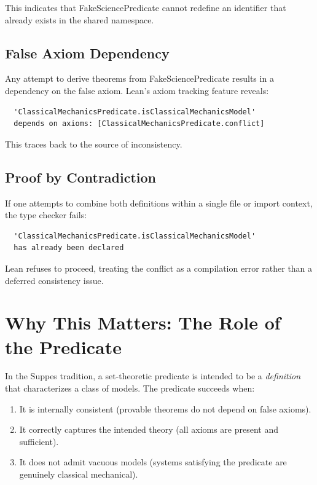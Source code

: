\documentclass[11pt]{article}
\begin{document}
This indicates that FakeSciencePredicate cannot redefine an identifier that
already exists in the shared namespace.

\subsection{False Axiom Dependency}

Any attempt to derive theorems from FakeSciencePredicate results in a
dependency on the false axiom. Lean's axiom tracking feature reveals:
\begin{verbatim}
  'ClassicalMechanicsPredicate.isClassicalMechanicsModel'
  depends on axioms: [ClassicalMechanicsPredicate.conflict]
\end{verbatim}

This traces back to the source of inconsistency.

\subsection{Proof by Contradiction}

If one attempts to combine both definitions within a single file or import
context, the type checker fails:
\begin{verbatim}
  'ClassicalMechanicsPredicate.isClassicalMechanicsModel'
  has already been declared
\end{verbatim}

Lean refuses to proceed, treating the conflict as a compilation error rather
than a deferred consistency issue.

\section{Why This Matters: The Role of the Predicate}

In the Suppes tradition, a set-theoretic predicate is intended to be a
\textit{definition} that characterizes a class of models. The predicate
succeeds when:
\begin{enumerate}
  \item It is internally consistent (provable theorems do not depend on false
    axioms).
  \item It correctly captures the intended theory (all axioms are present and
    sufficient).
  \item It does not admit vacuous models (systems satisfying the predicate are
    genuinely classical mechanical).
\end{enumerate}
\end{document}
